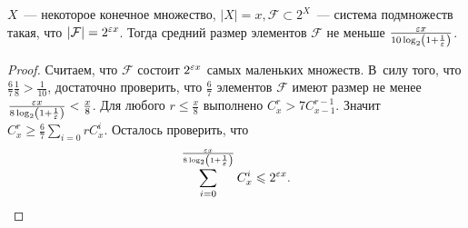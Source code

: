 \documentclass{article}
\begin{document}
\begin{lemma}
	$X$~--- некоторое конечное множество, $|X| = x, \mathcal{F} \subset 2^X$~---
	система подмножеств такая, что $|\mathcal{F}| = 2^{\varepsilon x}$. Тогда средний
	размер элементов $\mathcal{F}$ не меньше $\frac{\varepsilon x}{10 \log_2 \left(1 +
	\frac{1}{\varepsilon}\right)}$.
\end{lemma}
\begin{proof}
	Считаем, что $\mathcal{F}$ состоит $2^{\varepsilon x}$ самых маленьких множеств.
	В~силу того, что $\frac{6}{7} \frac{1}{8} > \frac{1}{10}$, достаточно
	проверить, что $\frac{6}{7}$ элементов $\mathcal{F}$ имеют размер не менее
	$\frac{\varepsilon x}{8 \log_2 \left(1 + \frac{1}{\varepsilon}\right)} < \frac{x}{8}$. Для
	любого $r \le \frac{x}{8}$ выполнено $C_x^r > 7 C_{x-1}^{r-1}$. Значит $C_x^r
	\ge \frac{6}{7} \sum\limits_{i=0}{r} C_x^i$. Осталось проверить, что
	$$\sum\limits_{i=0}^\frac{\varepsilon x}{8 \log_2 \left( 1 + \frac{1}{\varepsilon}
	\right)} C_x^i \leqslant 2^{\varepsilon x}.$$
\end{proof}
\end{document}
